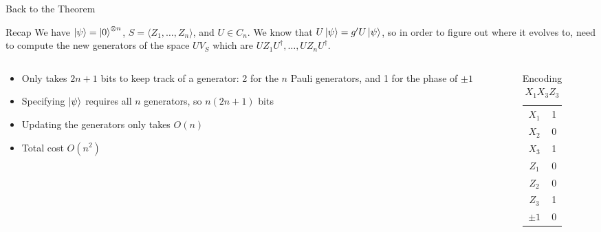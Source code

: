 \documentclass[11pt,aspectratio=1610]{beamer}
\begin{document}
\begin{frame}{Back to the Theorem}
	\begin{exampleblock}{Recap}
		We have $\ket{\psi} = \ket{0}^{\otimes n}$, $S = \langle Z_1,\ldots , Z_n\rangle$, and $U\in C_n$. We know that $U\ket{\psi} = g'U\ket{\psi}$, so in order to figure out where it evolves to, need to compute the new generators of the space $UV_S$ which are $UZ_1U^\dagger,\ldots, UZ_nU^\dagger$.
	\end{exampleblock}
	\begin{columns}
		\begin{column}{0.7\textwidth}
			\begin{itemize}
				\item Only takes $2n+1$ bits to keep track of a generator: 2 for the $n$ Pauli generators, and 1 for the phase of $\pm 1$
				\item Specifying $\ket{\psi}$ requires all $n$ generators, so $n(2n+1)$ bits
				\item Updating the generators only takes $O(n)$
				\item Total cost $O(n^2)$
			\end{itemize}
		\end{column}
		\begin{column}{0.3\textwidth}
			\begin{table}
				\centering
				\begin{tabular}{cc}
					$X_1$   & 1 \\
					$X_2$   & 0 \\
					$X_3$   & 1 \\
					$Z_1$   & 0 \\
					$Z_2$   & 0 \\
					$Z_3$   & 1 \\ \midrule
					$\pm 1$ & 0
				\end{tabular}
				\caption{Encoding $X_1X_3Z_3$}
			\end{table}
		\end{column}
	\end{columns}
\end{frame}
\end{document}
